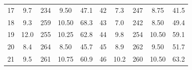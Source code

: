 \documentclass[12pt,B5paper,]{book}
\begin{document}
\begin{table}[H]
\begin{tabular}{ccccc|ccccc}
17                   & 9.7                                                      & 234                                                       & 9.50                                                      & 47.1                                                     & 42                   & 7.3                                                      & 247                                                       & 8.75                                                      & 41.5                                                     \\
18                   & 9.3                                                      & 259                                                       & 10.50                                                     & 68.3                                                     & 43                   & 7.0                                                      & 242                                                       & 8.50                                                      & 49.4                                                     \\
19                   & 12.0                                                     & 255                                                       & 10.25                                                     & 62.8                                                     & 44                   & 9.8                                                      & 254                                                       & 10.50                                                     & 59.1                                                     \\
20                   & 8.4                                                      & 264                                                       & 8.50                                                      & 45.7                                                     & 45                   & 8.9                                                      & 262                                                       & 9.50                                                      & 51.7                                                     \\
21                   & 9.5                                                      & 261                                                       & 10.75                                                     & 60.9                                                     & 46                   & 10.2                                                     & 260                                                       & 10.50                                                     & 63.2                                                     \\

\end{tabular}
\end{table}
\end{document}
